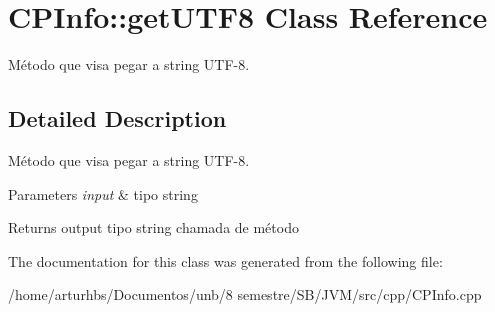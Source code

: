 \hypertarget{classCPInfo_1_1getUTF8}{}\section{C\+P\+Info\+:\+:get\+U\+T\+F8 Class Reference}
\label{classCPInfo_1_1getUTF8}


Método que visa pegar a string U\+T\+F-\/8.  




\subsection{Detailed Description}
Método que visa pegar a string U\+T\+F-\/8. 


\begin{DoxyParams}{Parameters}
{\em input} & tipo string \\
\hline
\end{DoxyParams}
\begin{DoxyReturn}{Returns}
output tipo string chamada de método 
\end{DoxyReturn}


The documentation for this class was generated from the following file\+:\begin{DoxyCompactItemize}
\item 
/home/arturhbs/\+Documentos/unb/8 semestre/\+S\+B/\+J\+V\+M/src/cpp/C\+P\+Info.\+cpp\end{DoxyCompactItemize}
